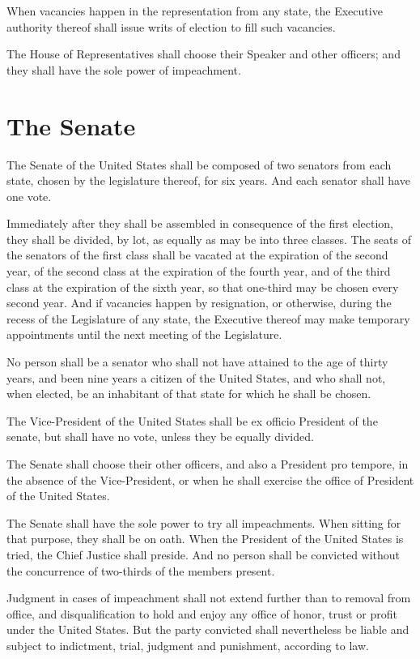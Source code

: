 \documentclass{constitution}
\begin{document}
When vacancies happen in the representation from any state,
the Executive authority thereof shall issue writs of election to fill such vacancies.

The House of Representatives shall choose their Speaker and other officers;
and they shall have the sole power of impeachment.

\section{The Senate}
The Senate of the United States shall be composed of two senators from each state, chosen by the legislature thereof, for six years.
And each senator shall have one vote.

Immediately after they shall be assembled in consequence of the first election,
they shall be divided, by lot, as equally as may be into three classes.
The seats of the senators of the first class shall be vacated at the expiration of the second year,
of the second class at the expiration of the fourth year,
and of the third class at the expiration of the sixth year,
so that one-third may be chosen every second year.
And if vacancies happen by resignation, or otherwise, during the recess of the Legislature of any state,
the Executive thereof may make temporary appointments until the next meeting of the Legislature.

No person shall be a senator who shall not have attained to the age of thirty years,
and been nine years a citizen of the United States,
and who shall not, when elected, be an inhabitant of that state for which he shall be chosen.

The Vice-President of the United States shall be ex officio President of the senate,
but shall have no vote, unless they be equally divided.

The Senate shall choose their other officers,
and also a President pro tempore, in the absence of the Vice-President, or when he shall exercise the office of President of the United States.

The Senate shall have the sole power to try all impeachments.
When sitting for that purpose, they shall be on oath.
When the President of the United States is tried, the Chief Justice shall preside.
And no person shall be convicted without the concurrence of two-thirds of the members present.

Judgment in cases of impeachment shall not extend further than to removal from office, and disqualification to hold and enjoy any office of honor, trust or profit under the United States.
But the party convicted shall nevertheless be liable and subject to indictment, trial, judgment and punishment, according to law.
\end{document}
